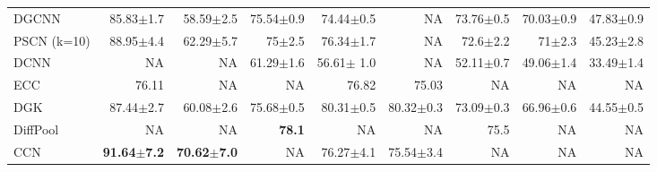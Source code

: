 \documentclass{article}
\begin{document}
\begin{table}[t]
{\begin{tabular}{@{\hskip8pt}l@{\hskip8pt}r@{\hskip8pt}r@{\hskip8pt}r@{\hskip8pt}r@{\hskip8pt}r@{\hskip8pt}r@{\hskip8pt}r@{\hskip8pt}r@{\hskip8pt}}
		\midrule
			DGCNN \citep{Zhang} & 85.83$\pm$1.7 & 58.59$\pm$2.5 &  75.54$\pm$0.9 & 74.44$\pm$0.5 & NA    & 73.76$\pm$0.5 & 70.03$\pm$0.9 & 47.83$\pm$0.9 \\
		PSCN \citep{Niepert2016}{\tiny (k=10)} & 88.95$\pm$4.4 & 62.29$\pm$5.7 & 75$\pm$2.5 & 76.34$\pm$1.7 & NA    & 72.6$\pm$2.2 & 71$\pm$2.3 & 45.23$\pm$2.8 \\
		DCNN \citep{Atwood2015}  & NA    & NA    &  61.29$\pm$1.6 & 56.61$\pm$ 1.0 & NA    & 52.11$\pm$0.7 & 49.06$\pm$1.4 & 33.49$\pm$1.4 \\
		ECC \citep{Simonovsky2017}  & 76.11 & NA    &  NA    & 76.82 & 75.03 & NA    & NA    & NA \\
		DGK \citep{Yanardag2015}  & 87.44$\pm$2.7 & 60.08$\pm$2.6 &  75.68$\pm$0.5 & 80.31$\pm$0.5 & 80.32$\pm$0.3 & 73.09$\pm$0.3 & 66.96$\pm$0.6 & 44.55$\pm$0.5 \\
		DiffPool \citep{Ying2018} & NA    & NA    &  \bf{78.1}  & NA    & NA    & 75.5  & NA    & NA \\
		CCN \citep{Kondor2018}  & \bf{91.64$\pm$7.2} & \bf{70.62$\pm$7.0} &  NA    & 76.27$\pm$4.1 & 75.54$\pm$3.4 & NA    & NA    & NA \\
		

\end{tabular}}
\end{table}
\end{document}
